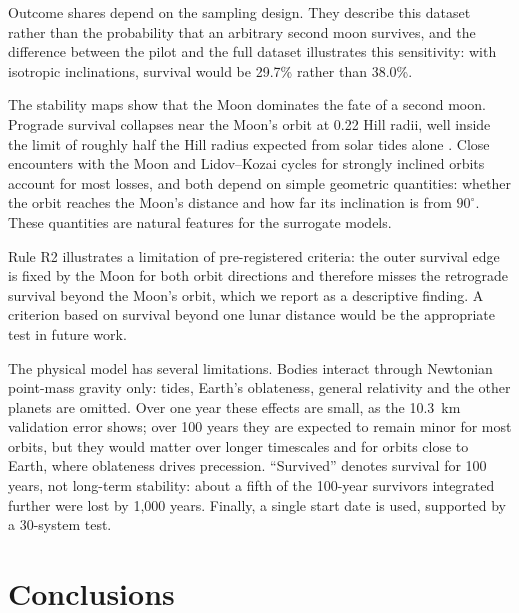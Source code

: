 \documentclass[twocolumn]{aastex631}
\begin{document}
Outcome shares depend on the sampling design. They describe this dataset rather than the
probability that an arbitrary second moon survives, and the difference between the pilot and the
full dataset illustrates this sensitivity: with isotropic inclinations, survival would be 29.7\%
rather than 38.0\%.

The stability maps show that the Moon dominates the fate of a second moon. Prograde survival
collapses near the Moon's orbit at 0.22 Hill radii, well inside the limit of roughly half the Hill
radius expected from solar tides alone \citep{Domingos2006}. Close encounters with the Moon and
Lidov--Kozai cycles for strongly inclined orbits account for most losses, and both depend on
simple geometric quantities: whether the orbit reaches the Moon's distance and how far its
inclination is from $90^\circ$. These quantities are natural features for the surrogate models.

Rule R2 illustrates a limitation of pre-registered criteria: the outer survival edge is fixed by
the Moon for both orbit directions and therefore misses the retrograde survival beyond the Moon's
orbit, which we report as a descriptive finding. A criterion based on survival beyond one lunar
distance would be the appropriate test in future work.

The physical model has several limitations. Bodies interact through Newtonian point-mass gravity
only: tides, Earth's oblateness, general relativity and the other planets are omitted. Over one
year these effects are small, as the 10.3~km validation error shows; over 100 years they are
expected to remain minor for most orbits, but they would matter over longer timescales and for
orbits close to Earth, where oblateness drives precession. ``Survived'' denotes survival for 100
years, not long-term stability: about a fifth of the 100-year survivors integrated further were
lost by 1,000 years. Finally, a single start date is used, supported by a 30-system test.

\section{Conclusions} \label{sec:conclusions}
\end{document}
